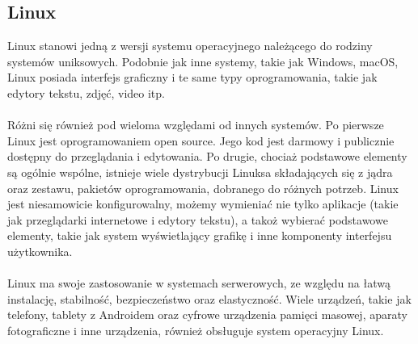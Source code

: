 \documentclass[10pt,a4paper]{report}
\begin{document}
\begin{adjustwidth}{2cm}{2cm}
\section{Linux}
\begin{minipage}{1\linewidth}
Linux stanowi jedną z wersji systemu operacyjnego należącego do rodziny systemów uniksowych.
Podobnie jak inne systemy, takie jak Windows, macOS, Linux posiada interfejs graficzny i te same typy oprogramowania, takie jak edytory tekstu, zdjęć, video itp. \\ \\
Różni się również pod wieloma względami od innych systemów. Po pierwsze Linux jest oprogramowaniem open source. Jego kod jest darmowy i publicznie dostępny do przeglądania i edytowania. Po drugie, chociaż podstawowe elementy są ogólnie wspólne, istnieje wiele dystrybucji Linuksa składających się z jądra oraz zestawu, pakietów oprogramowania, dobranego do różnych potrzeb. Linux jest niesamowicie konfigurowalny, możemy wymieniać nie tylko aplikacje (takie jak przeglądarki internetowe i edytory tekstu), a takoż wybierać podstawowe elementy, takie jak system wyświetlający grafikę i inne komponenty interfejsu użytkownika. \\ \\
Linux ma swoje zastosowanie w systemach serwerowych, ze względu na łatwą instalację, stabilność, bezpieczeństwo oraz elastyczność. Wiele urządzeń, takie jak telefony, tablety z Androidem oraz cyfrowe urządzenia pamięci masowej, aparaty fotograficzne i inne urządzenia, również obsługuje system operacyjny Linux.
\end{minipage}

\end{adjustwidth}
\end{document}
